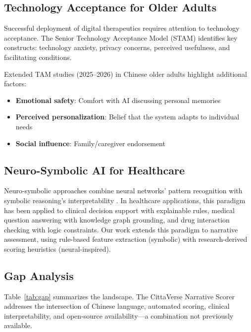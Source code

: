 \documentclass[11pt]{article}
\begin{document}
\subsection{Technology Acceptance for Older Adults}

Successful deployment of digital therapeutics requires attention to technology acceptance. The Senior Technology Acceptance Model (STAM) \citep{mitzner2024} identifies key constructs: technology anxiety, privacy concerns, perceived usefulness, and facilitating conditions.

Extended TAM studies (2025--2026) in Chinese older adults highlight additional factors:
\begin{itemize}
    \item \textbf{Emotional safety}: Comfort with AI discussing personal memories \citep{zhang2025}
    \item \textbf{Perceived personalization}: Belief that the system adapts to individual needs \citep{liu2025b}
    \item \textbf{Social influence}: Family/caregiver endorsement \citep{chen2026}
\end{itemize}

\subsection{Neuro-Symbolic AI for Healthcare}

Neuro-symbolic approaches combine neural networks' pattern recognition with symbolic reasoning's interpretability \citep{garcez2025}. In healthcare applications, this paradigm has been applied to clinical decision support with explainable rules, medical question answering with knowledge graph grounding, and drug interaction checking with logic constraints. Our work extends this paradigm to narrative assessment, using rule-based feature extraction (symbolic) with research-derived scoring heuristics (neural-inspired).

\subsection{Gap Analysis}

Table~\ref{tab:gap} summarizes the landscape. The CittaVerse Narrative Scorer addresses the intersection of Chinese language, automated scoring, clinical interpretability, and open-source availability---a combination not previously available.
\end{document}
